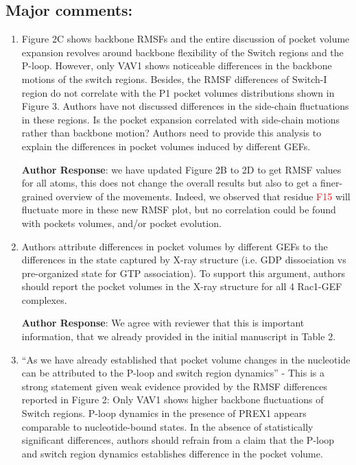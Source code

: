 \documentclass[11pt, a4paper]{article}
\begin{document}
\subsection{Major comments:}
 \begin{enumerate}   
    \item Figure 2C shows backbone RMSFs and the entire discussion of pocket volume expansion revolves around backbone flexibility of the Switch regions and the P-loop. However, only VAV1 shows noticeable differences in the backbone motions of the switch regions. Besides, the RMSF differences of Switch-I region do not correlate with the P1 pocket volumes distributions shown in Figure 3. Authors have not discussed differences in the side-chain fluctuations in these regions. Is the pocket expansion correlated with side-chain motions rather than backbone motion? Authors need to provide this analysis to explain the differences in pocket volumes induced by different GEFs.

\textbf{Author Response}: we have updated Figure 2B to 2D to get RMSF values for all atoms, this does not change the overall results but also to get a finer-grained overview of the movements. Indeed, we observed that residue \textcolor{red}{F15} will fluctuate more in these new RMSF plot, but no correlation could be found with pockets volumes, and/or pocket evolution.

    \item Authors attribute differences in pocket volumes by different GEFs to the differences in the state captured by X-ray structure (i.e. GDP dissociation vs pre-organized state for GTP association). To support this argument, authors should report the pocket volumes in the X-ray structure for all 4 Rac1-GEF complexes.

\textbf{Author Response}: We agree with reviewer that this is important information, that we already provided in the initial manuscript in Table 2.

    \item “As we have already established that pocket volume changes in the nucleotide can be attributed to the P-loop and switch region dynamics” - This is a strong statement given weak evidence provided by the RMSF differences reported in Figure 2: Only VAV1 shows higher backbone fluctuations of Switch regions. P-loop dynamics in the presence of PREX1 appears comparable to nucleotide-bound states. In the absence of statistically significant differences, authors should refrain from a claim that the P-loop and switch region dynamics establishes difference in the pocket volume.


\end{enumerate}
\end{document}
